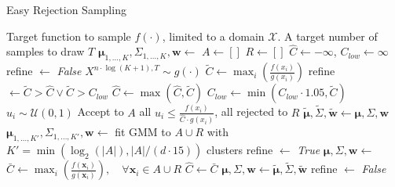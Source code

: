 \documentclass{ecai}  %
\begin{document}
%
%
%
%
\begin{algorithm}[!h]
\caption{Easy Rejection Sampling} \label{algo:ers}
\begin{algorithmic}[1]
\Require Target function to sample $f(\cdot)$, limited to a domain $\mathcal{X}$. A target number of samples to draw $T$ 
%
    \State $\bm{\mu}_{1, \ldots, K}, \Sigma_{1, \ldots, K}, \bm{w} \gets $  
    \State $A \gets []$ 
    \State $R \gets []$ 
    \State $\hat{C} \gets -\infty$, $C_\mathit{low} \gets \infty$
    \State refine $\gets$ \textit{False}
         \State $X^{n \cdot \log(K+1), T} \sim g(\cdot)$ 
         \State $\tilde{C} \gets \max_i\left( \frac{f(x_i)}{g(x_i)} \right)$ 
         \State refine $\gets \tilde{C} > \hat{C} \lor \tilde{C} > C_{\mathit{low}}$
         \State $\hat{C} \gets \max(\hat{C}, \tilde{C})$ 
         \State $C_{\mathit{low}} \gets \min(C_{\mathit{low}}\cdot1.05, \tilde{C})$
         \State $u_i \sim \mathcal{U}(0, 1)$
         \State Accept to $A$ all $u_i \leq \frac{f(x_i)}{\hat{C} \cdot g(x_i)}$, all rejected to $R$ 
        \State $\bm{\tilde{\mu}}, \tilde{\Sigma}, \bm{\tilde{w}} \gets \bm{\mu}, \Sigma, \bm{w} $
            \State $\bm{\mu}_{1, \ldots, K'}, \Sigma_{1, \ldots, K'}, \bm{w} \gets $ fit GMM to $A \cup R$ with $K' = \min(\log_2(|A|), |A|/(d \cdot 15))$ clusters
            \State refine $\gets$ \textit{True}
         \EndIf
            \State $\bm{\mu}, \Sigma, \bm{w} \gets $  
            \State $\bar{C} \gets \max_i\left(\frac{f(\bm{x}_i)}{g(\bm{x}_i)}\right), \quad \forall \bm{x}_i \in A \cup R$ 
                \State $\hat{C} \gets \bar{C}$
            \Else
                \State $ \bm{\mu}, \Sigma, \bm{w} \gets \bm{\tilde{\mu}}, \tilde{\Sigma}, \bm{\tilde{w}} $ 
            \EndIf
            \State refine $\gets$ \textit{False}
         \EndIf
    \EndWhile
%
\end{algorithmic}
\end{algorithm}
%
%
%
\end{document}
